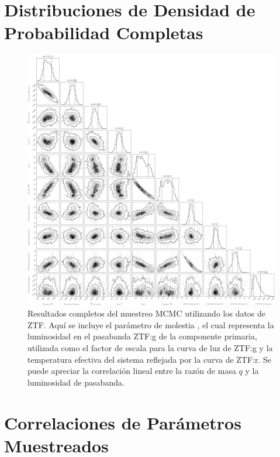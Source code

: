 \section{Distribuciones de Densidad de Probabilidad Completas} \label{apendice:modelo_computacional_graficas:resultados_pdfs_completas}

\begin{figure}[!ht]
    \centering
    \includegraphics[scale=0.255]{Apendice/Figures/Figura MCMC ZTF Resultados Completos.png}
    \caption{Resultados completos del muestreo MCMC utilizando los datos de ZTF.
    Aquí se incluye el parámetro de molestia , el
    cual representa la luminosidad en el pasabanda ZTF:g de la componente
    primaria, utilizada como el factor de escala para la curva de luz de ZTF:g y
    la temperatura efectiva del sistema reflejada por la curva de ZTF:r. Se
    puede apreciar la correlación lineal entre la razón de masa $q$ y la
    luminosidad de pasabanda.}
    \label{figuraPhoebeMcmcResultadosCompletos}
\end{figure}

\section{Correlaciones de Parámetros Muestreados} \label{apendice:modelo_computacional_graficas:correlaciones_parametros_muestreados}


